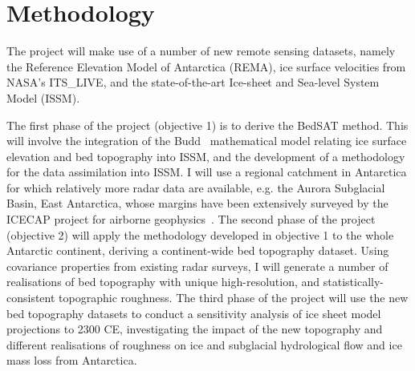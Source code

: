 \chapter*{Methodology}

The project will make use of a number of new remote sensing datasets, namely the Reference Elevation Model of Antarctica (REMA), ice surface velocities from NASA’s ITS\_LIVE, and the state-of-the-art Ice-sheet and Sea-level System Model (ISSM).

The first phase of the project (objective 1) is to derive the BedSAT method. This will involve the integration of the Budd~\cite{Budd_1970} mathematical model relating ice surface elevation and bed topography into ISSM, and the development of a methodology for the data assimilation into ISSM. I will use a regional catchment in Antarctica for which relatively more radar data are available, e.g. the Aurora Subglacial Basin, East Antarctica, whose margins have been extensively surveyed by the ICECAP project for airborne geophysics~\cite{Young2011}. The second phase of the project (objective 2) will apply the methodology developed in objective 1 to the whole Antarctic continent, deriving a continent-wide bed topography dataset. Using covariance properties from existing radar surveys, I will generate a number of realisations of bed topography with unique high-resolution, and statistically-consistent topographic roughness. The third phase of the project will use the new bed topography datasets to conduct a sensitivity analysis of ice sheet model projections to 2300 CE, investigating the impact of the new topography and different realisations of roughness on ice and subglacial hydrological flow and ice mass loss from Antarctica.\\